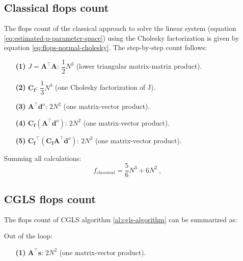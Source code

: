 
\subsection{Classical flops count}

The flops count of the classical approach to solve the linear system (equation \ref{eq:estimated-p-parameter-space}) using the Cholesky factorization is given by equation \ref{eq:flops-normal-cholesky}. The step-by-step count follows:
\begin{itemize}
\item[\textbf{(1)}] $J = \mathbf{A}^{\top}\mathbf{A}$: $\dfrac{1}{2} N^3$ (lower triangular matrix-matrix product).

\item[\textbf{(2)}] $\mathbf{C_f}: \, \dfrac{1}{3} N^3$ (one Cholesky factorization of J).

\item[\textbf{(3)}] $\mathbf{A}^{\top} \mathbf{d}^{o}$: $2 N^2$ (one matrix-vector product).

\item[\textbf{(4)}] $\mathbf{C_f} (\mathbf{A}^{\top} \mathbf{d}^{o})$: $2 N^2$ (one matrix-vector product).

\item[\textbf{(5)}] $\mathbf{C_f}^{\top} (\mathbf{C_f} \mathbf{A}^{\top} \mathbf{d}^{o})$: $2 N^2$ (one matrix-vector product).
\end{itemize}
Summing all calculations: 
\begin{equation}
f_{classical} =  \dfrac{5}{6} N^{3} + 6 N^{2}\: ,
\label{eq:flops-normal-cholesky-append}
\end{equation}

\subsection{CGLS flops count}

The flops count of CGLS algorithm \ref{al:cgls-algorithm} can be summarized as:

Out of the loop:

\begin{itemize}

\item[\textbf{(1)}] $\mathbf{A}^{\top} \mathbf{s}$: $2 N^2$ (one matrix-vector product).
\end{itemize}

